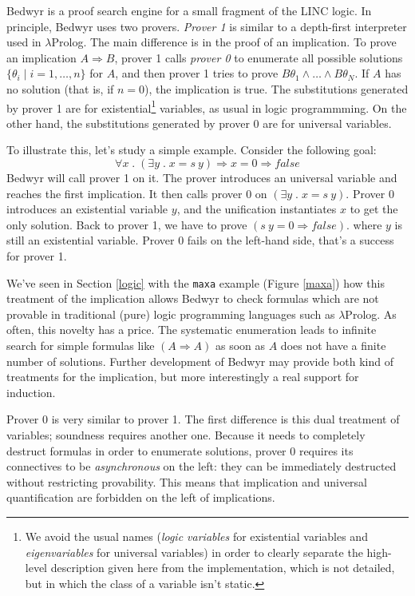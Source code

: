 \documentclass{article}
\newcommand{\lp}{$\lambda$Prolog}
\newcommand{\qs}{\; . \;}
\begin{document}
Bedwyr is a proof search engine for a small fragment of the LINC
logic.  In principle, Bedwyr uses two provers.  {\em Prover 1} is similar to
a depth-first interpreter used in $\lambda$Prolog.  The main
difference is in the proof of an implication.  
To prove an implication $A\Rightarrow B$, prover 1  calls {\em prover 0}
to enumerate all possible solutions
$\{\theta_i\;|\;i=1,\ldots,n\}$ for $A$, 
and then prover 1 tries to prove $B\theta_1\wedge\dots\wedge B\theta_N$.
If $A$ has no solution (that is, if $n=0$), the implication is true.
The substitutions generated by prover 1 are for existential\footnote{
We avoid the usual names (\emph{logic variables} for existential variables and 
\emph{eigenvariables} for universal variables) in order to clearly separate the 
high-level description given here from the implementation, which is not 
detailed, but in which the class of a variable isn't static.}
variables, as usual in logic programmming.
On the other hand, the substitutions generated by prover 0 are for
universal variables. 

To illustrate this, let's study a simple example.
Consider the following goal:
\[ \forall x \qs (\exists y \qs x=s~y) \Rightarrow x=0 \Rightarrow false \]
Bedwyr will call prover 1 on it. The prover introduces an universal variable
and reaches the first implication.
It then calls prover 0 on $(\exists y \qs x = s~y)$.
Prover 0 introduces an existential variable $y$,
and the unification instantiates $x$ to get the only solution.
Back to prover 1, we have to prove $(s~y = 0 \Rightarrow false)$.
where $y$ is still an existential variable. Prover 0 fails on the 
left-hand side, that's a success for prover 1.

We've seen in Section \ref{logic} with the \verb.maxa. example
(Figure \ref{maxa}) how this treatment of the implication allows
Bedwyr to check formulas which are not provable in traditional (pure) logic 
programming languages such as \lp.
As often, this novelty has a price. The systematic enumeration leads to 
infinite search for simple formulas like $(A \Rightarrow A)$ as soon as
$A$ does not have a finite number of solutions.
Further development of Bedwyr may provide both kind of treatments for 
the implication, but more interestingly a real support for induction.

Prover 0 is very similar to prover 1.
The first difference is this dual treatment of variables;
soundness requires another one.
Because it needs to completely destruct formulas in order to enumerate 
solutions, prover 0 requires its connectives to be \emph{asynchronous} on the 
left: they can be immediately destructed without restricting provability.
This means that implication and universal quantification are forbidden on the 
left of implications.
\end{document}
